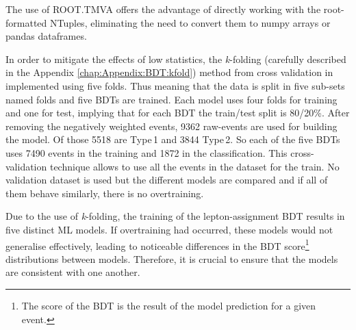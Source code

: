  
The use of ROOT.TMVA offers the advantage of directly 
working with the root-formatted NTuples, eliminating the need to 
convert them to numpy arrays or pandas dataframes.


In order to mitigate the effects of low statistics, the \textit{k}-folding (carefully described in 
the Appendix \ref{chap:Appendix:BDT:kfold}) method from cross validation in implemented using five folds. 
Thus meaning that the data is split in five sub-sets named folds 
and five BDTs are trained. Each model uses four folds
for training and one for test, implying that for each BDT the train/test split is 80/20\%.
After removing the negatively weighted events, 9362 raw-events are used for building the model.
Of those 5518 are Type$\,$1 and 3844 Type$\,$2. So each of the five BDTs uses 7490 events
in the training and 1872 in the classification.
This cross-validation technique allows to use all the events in the dataset for the train. 
No validation dataset is used but the different models
 are compared and if all of them behave similarly, there is no overtraining. 
 
 Due to the use of \textit{k}-folding, the training of the lepton-assignment BDT results 
 in five distinct ML models. If overtraining had occurred, these models would not 
 generalise effectively, leading to noticeable differences in the BDT score\footnote{The 
 score of the BDT is the result of the model prediction for a given event.} distributions 
 between models. Therefore, it is crucial to ensure that the models are consistent 
 with one another.
 
